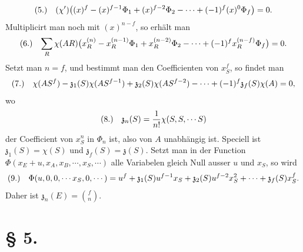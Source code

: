 \documentclass[11pt]{article}
\makeatletter
\newcommand{\frobtag}[2]{\[\begin{array}{@{}r@{\quad}l@{}}\textup{(#1)} & \displaystyle #2\end{array}\]}
\newcommand{\frobtagc}[2]{\[\begin{array}{@{}r@{\quad}c@{}}\textup{(#1)} & \displaystyle #2\end{array}\]}
\makeatother
\begin{document}
\frobtag{5.}{(\chi')\bigl((x)^f-(x)^{f-1}\Phi_1+(x)^{f-2}\Phi_2-\cdots+(-1)^f(x)^0\Phi_f\bigr)=0.}
Multiplicirt man noch mit $(x)^{n-f}$, so erhält man
\frobtag{6.}{\sum_R\chi(AR)\bigl(x_R^{(n)}-x_R^{(n-1)}\Phi_1+x_R^{(n-2)}\Phi_2-\cdots+(-1)^f x_R^{(n-f)}\Phi_f\bigr)=0.}
Setzt man $n=f$, und bestimmt man den Coefficienten von $x_S^f$, so findet man
\frobtag{7.}{\chi(AS^f)-\mathfrak{z}_1(S)\chi(AS^{f-1})+\mathfrak{z}_2(S)\chi(AS^{f-2})-\cdots+(-1)^f\mathfrak{z}_f(S)\chi(A)=0,}
wo
\frobtagc{8.}{\mathfrak{z}_n(S)=\frac{1}{n!}\chi(S,S,\cdots S)}
der Coefficient von $x_S^n$ in $\Phi_n$ ist, also von $A$ unabhängig ist. Speciell ist $\mathfrak{z}_1(S)=\chi(S)$ und $\mathfrak{z}_f(S)=\mathfrak{z}(S)$. Setzt man in der Function $\Phi(x_E+u,x_A,x_B,\cdots,x_S,\cdots)$ alle Variabelen gleich Null ausser $u$ und $x_S$, so wird
\frobtag{9.}{\Phi(u,0,0,\cdots x_S,0,\cdots)=u^f+\mathfrak{z}_1(S)u^{f-1}x_S+\mathfrak{z}_2(S)u^{f-2}x_S^2+\cdots+\mathfrak{z}_f(S)x_S^f.}
Daher ist $\mathfrak{z}_n(E)=\binom{f}{n}$.

\section*{§ 5.}
\end{document}
